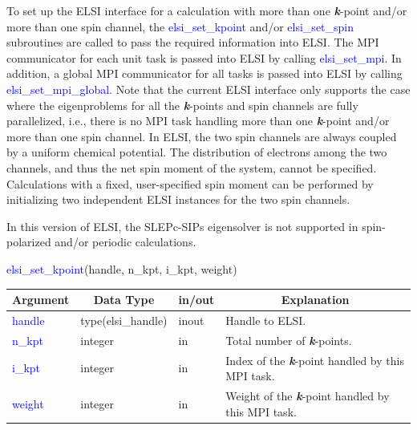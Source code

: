 \documentclass{report}
\begin{document}
To set up the ELSI interface for a calculation with more than one \textbf{\textit{k}}-point and/or more than one spin channel, the \textcolor{blue}{elsi\_set\_kpoint} and/or \textcolor{blue}{elsi\_set\_spin} subroutines are called to pass the required information into ELSI. The MPI communicator for each unit task is passed into ELSI by calling \textcolor{blue}{elsi\_set\_mpi}. In addition, a global MPI communicator for all tasks is passed into ELSI by calling \textcolor{blue}{elsi\_set\_mpi\_global}. Note that the current ELSI interface only supports the case where the eigenproblems for all the \textbf{\textit{k}}-points and spin channels are fully parallelized, i.e., there is no MPI task handling more than one \textbf{\textit{k}}-point and/or more than one spin channel. In ELSI, the two spin channels are always coupled by a uniform chemical potential. The distribution of electrons among the two channels, and thus the net spin moment of the system, cannot be specified. Calculations with a fixed, user-specified spin moment can be performed by initializing two independent ELSI instances for the two spin channels.

In this version of ELSI, the SLEPc-SIPs eigensolver is not supported in spin-polarized and/or periodic calculations.
\begin{labeling}{\hspace{6cm}}
\item [\hspace{0.3cm} \textcolor{blue}{elsi\_set\_kpoint}(handle, n\_kpt, i\_kpt, weight)]
\end{labeling}

\begin{tabular}[]{|p{30mm}|p{30mm}|p{15mm}|p{90mm}|}
\hline
\multicolumn{1}{|c|}{\textbf{Argument}} & \multicolumn{1}{c|}{\textbf{Data Type}} & \multicolumn{1}{c|}{\textbf{in/out}} & \multicolumn{1}{c|}{\textbf{Explanation}}\\
\hline
\textcolor{blue}{handle} & type(elsi\_handle) & inout & Handle to ELSI.\\
\hline
\textcolor{blue}{n\_kpt} & integer            & in    & Total number of \textbf{\textit{k}}-points.\\
\hline
\textcolor{blue}{i\_kpt} & integer            & in    & Index of the \textbf{\textit{k}}-point handled by this MPI task.\\
\hline
\textcolor{blue}{weight} & integer            & in    & Weight of the \textbf{\textit{k}}-point handled by this MPI task.\\
\hline
\end{tabular}
\end{document}
